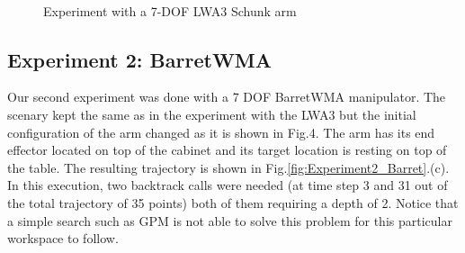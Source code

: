 \documentclass[conference]{IEEEtran}
\begin{document}
\begin{figure}[]
  \centering
   \\
  \caption{ Experiment with a 7-DOF LWA3 Schunk arm}
  \label{fig:Experiment1_LWA3}
\end{figure}


\subsection{Experiment 2: BarretWMA}
Our second experiment was done with a 7 DOF BarretWMA
manipulator. The scenary kept the same as in the experiment
with the LWA3 but the initial configuration of the arm changed
as it is shown in Fig.4. The arm has its end effector located
on top of the cabinet and its target location is resting on top
of the table. The resulting trajectory is shown in Fig.\ref{fig:Experiment2_Barret}.(c).
In this execution, two backtrack calls were needed (at time
step 3 and 31 out of the total trajectory of 35 points) both of
them requiring a depth of 2. Notice that a simple search such
as GPM is not able to solve this problem for this particular
workspace to follow.
\end{document}
